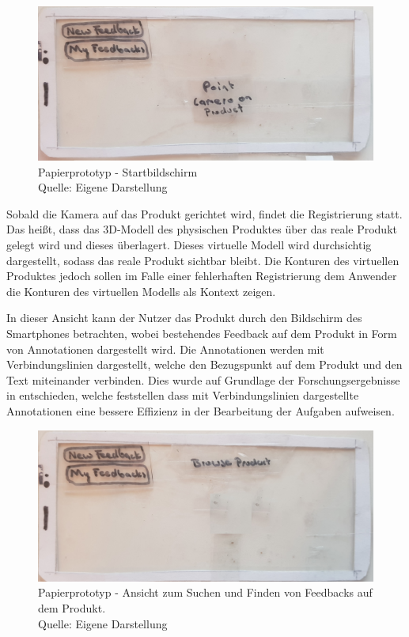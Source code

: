 \begin{figure}[H]
	\centering
	\includegraphics[width=.7\textwidth]{resources/conception/lowfi_startbildschirm.jpg}
	\caption{Papierprototyp - Startbildschirm  \\Quelle: Eigene Darstellung}
	\label{img:pp_start}
\end{figure}

Sobald die Kamera auf das Produkt gerichtet wird, findet die Registrierung statt. Das heißt, dass das 3D-Modell des physischen Produktes über das reale Produkt gelegt wird und dieses überlagert. 
Dieses virtuelle Modell wird durchsichtig dargestellt, sodass das reale Produkt sichtbar bleibt. Die Konturen des virtuellen Produktes jedoch sollen im Falle einer fehlerhaften Registrierung dem Anwender 
die Konturen des virtuellen Modells als Kontext zeigen.

In dieser Ansicht kann der Nutzer das Produkt durch den Bildschirm des Smartphones betrachten, wobei bestehendes Feedback auf dem Produkt in Form von Annotationen dargestellt wird. Die Annotationen werden mit Verbindungslinien dargestellt, welche den Bezugspunkt auf dem Produkt und den Text miteinander verbinden. Dies wurde auf Grundlage der Forschungsergebnisse in \cite{Brandenburg2019} \cite{Polys2007} entschieden, welche feststellen dass mit Verbindungslinien dargestellte Annotationen eine bessere Effizienz in der Bearbeitung der Aufgaben aufweisen.

\begin{figure}[H]
	\centering
	\includegraphics[width=.7\textwidth]{resources/conception/lowfi_browseOnProduct.jpg}
	\caption{Papierprototyp - Ansicht zum Suchen und Finden von Feedbacks auf dem Produkt. \\Quelle: Eigene Darstellung}
	\label{img:lowfibowseonproduct}
\end{figure}

